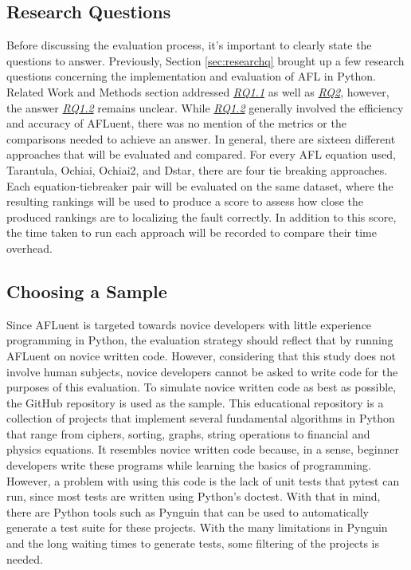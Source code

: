 \subsection{Research Questions}
\label{subsec:research_questions_eval}

Before discussing the evaluation process, it's important to clearly state the
questions to answer. Previously, Section \ref{sec:researchq} brought up a few
research questions concerning the implementation and evaluation of AFL in Python.
Related Work and Methods section addressed \hyperref[para:RQ1.1]{\emph{RQ1.1}} as well as
\hyperref[para:RQ2]{\emph{RQ2}}, however, the answer \hyperref[para:RQ1.2]{\emph{RQ1.2}} remains unclear. While \hyperref[para:RQ1.2]{\emph{RQ1.2}}
generally involved the efficiency and accuracy of AFLuent, there was no mention
of the metrics or the comparisons needed to achieve an answer. In general, there
are sixteen different approaches that will be evaluated and compared. For every AFL
equation used, Tarantula, Ochiai, Ochiai2, and Dstar, there are four tie breaking
approaches. Each equation-tiebreaker pair will be evaluated on the same dataset,
where the resulting rankings will be used to produce a score to assess how
close the produced rankings are to localizing the fault correctly. In addition to
this score, the time taken to run each approach will be recorded to compare
their time overhead.

\subsection{Choosing a Sample}
\label{subsec:choosing_sample}

Since AFLuent is targeted towards novice developers with little experience
programming in Python, the evaluation strategy should reflect that by running
AFLuent on novice written code. However, considering that this study does not
involve human subjects, novice developers cannot be asked to write code for the
purposes of this evaluation. To simulate novice written code as best as
possible, the GitHub repository \cite{the_algorithms_python}
is used as the sample. This educational repository is a collection of projects
that implement several fundamental algorithms in Python that range from ciphers,
sorting, graphs, string operations to financial and physics equations.
It resembles novice written
code because, in a sense, beginner developers write these programs while
learning the basics of programming. However, a problem
with using this code is the lack of unit tests that pytest can run, since most
tests are written using Python's doctest. With that in mind, there are Python
tools such as Pynguin\cite{Lukasczyk_Pynguin_Automated_Unit_2022}
that can be used to automatically generate a test suite for these projects.
With the many limitations in Pynguin and the long waiting times to generate
tests, some filtering of the projects is needed.


